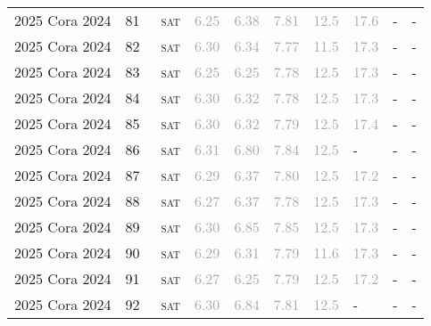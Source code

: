 \begin{center}
{\begin{longtable}{@{}llllllllll@{}}
2025 Cora 2024 & 81 & ~\textsc{sat} & \textcolor{darkgray}{6.25} & \textcolor{darkgray}{6.38} & \textcolor{darkgray}{7.81} & \textcolor{darkgray}{12.5} & \textcolor{darkgray}{17.6} & - & - \\
2025 Cora 2024 & 82 & ~\textsc{sat} & \textcolor{darkgray}{6.30} & \textcolor{darkgray}{6.34} & \textcolor{darkgray}{7.77} & \textcolor{darkgray}{11.5} & \textcolor{darkgray}{17.3} & - & - \\
2025 Cora 2024 & 83 & ~\textsc{sat} & \textcolor{darkgray}{6.25} & \textcolor{darkgray}{6.25} & \textcolor{darkgray}{7.78} & \textcolor{darkgray}{12.5} & \textcolor{darkgray}{17.3} & - & - \\
2025 Cora 2024 & 84 & ~\textsc{sat} & \textcolor{darkgray}{6.30} & \textcolor{darkgray}{6.32} & \textcolor{darkgray}{7.78} & \textcolor{darkgray}{12.5} & \textcolor{darkgray}{17.3} & - & - \\
2025 Cora 2024 & 85 & ~\textsc{sat} & \textcolor{darkgray}{6.30} & \textcolor{darkgray}{6.32} & \textcolor{darkgray}{7.79} & \textcolor{darkgray}{12.5} & \textcolor{darkgray}{17.4} & - & - \\
2025 Cora 2024 & 86 & ~\textsc{sat} & \textcolor{darkgray}{6.31} & \textcolor{darkgray}{6.80} & \textcolor{darkgray}{7.84} & \textcolor{darkgray}{12.5} & - & - & - \\
2025 Cora 2024 & 87 & ~\textsc{sat} & \textcolor{darkgray}{6.29} & \textcolor{darkgray}{6.37} & \textcolor{darkgray}{7.80} & \textcolor{darkgray}{12.5} & \textcolor{darkgray}{17.2} & - & - \\
2025 Cora 2024 & 88 & ~\textsc{sat} & \textcolor{darkgray}{6.27} & \textcolor{darkgray}{6.37} & \textcolor{darkgray}{7.78} & \textcolor{darkgray}{12.5} & \textcolor{darkgray}{17.3} & - & - \\
2025 Cora 2024 & 89 & ~\textsc{sat} & \textcolor{darkgray}{6.30} & \textcolor{darkgray}{6.85} & \textcolor{darkgray}{7.85} & \textcolor{darkgray}{12.5} & \textcolor{darkgray}{17.3} & - & - \\
2025 Cora 2024 & 90 & ~\textsc{sat} & \textcolor{darkgray}{6.29} & \textcolor{darkgray}{6.31} & \textcolor{darkgray}{7.79} & \textcolor{darkgray}{11.6} & \textcolor{darkgray}{17.3} & - & - \\
2025 Cora 2024 & 91 & ~\textsc{sat} & \textcolor{darkgray}{6.27} & \textcolor{darkgray}{6.25} & \textcolor{darkgray}{7.79} & \textcolor{darkgray}{12.5} & \textcolor{darkgray}{17.2} & - & - \\
2025 Cora 2024 & 92 & ~\textsc{sat} & \textcolor{darkgray}{6.30} & \textcolor{darkgray}{6.84} & \textcolor{darkgray}{7.81} & \textcolor{darkgray}{12.5} & - & - & - \\

\end{longtable}}
\end{center}
